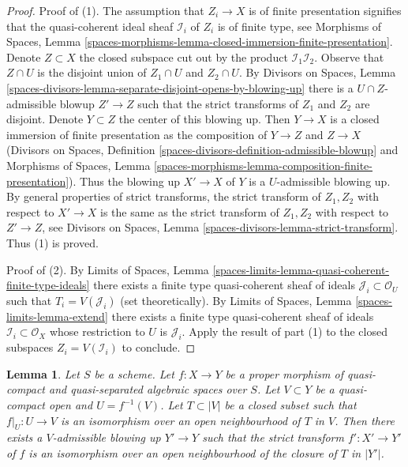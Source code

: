 \documentclass{stacks-project}
\theoremstyle{plain}
\newtheorem{lemma}[subsection]{Lemma}
\theoremstyle{definition}
\theoremstyle{remark}
\numberwithin{equation}{subsection}
\begin{document}
\begin{proof}
Proof of (1). The assumption that $Z_i \to X$ is of finite presentation
signifies that the quasi-coherent ideal sheaf $\mathcal{I}_i$ of $Z_i$
is of finite type, see 
Morphisms of Spaces, Lemma
\ref{spaces-morphisms-lemma-closed-immersion-finite-presentation}.
Denote $Z \subset X$ the closed subspace
cut out by the product $\mathcal{I}_1 \mathcal{I}_2$.
Observe that $Z \cap U$ is the disjoint union
of $Z_1 \cap U$ and $Z_2 \cap U$. By Divisors on Spaces, Lemma
\ref{spaces-divisors-lemma-separate-disjoint-opens-by-blowing-up}
there is a $U \cap Z$-admissible blowup $Z' \to Z$ such that
the strict transforms of $Z_1$ and $Z_2$ are disjoint.
Denote $Y \subset Z$ the center of this blowing up.
Then $Y \to X$ is a closed immersion of finite presentation as the composition
of $Y \to Z$ and $Z \to X$ (Divisors on Spaces, Definition
\ref{spaces-divisors-definition-admissible-blowup} and
Morphisms of Spaces, Lemma
\ref{spaces-morphisms-lemma-composition-finite-presentation}).
Thus the blowing up $X' \to X$ of $Y$ is a $U$-admissible blowing
up. By general properties of strict transforms, the
strict transform of $Z_1, Z_2$ with respect to $X' \to X$
is the same as the strict transform of $Z_1, Z_2$ with respect
to $Z' \to Z$, see
Divisors on Spaces, Lemma \ref{spaces-divisors-lemma-strict-transform}.
Thus (1) is proved.

\medskip\noindent
Proof of (2). By Limits of Spaces, Lemma
\ref{spaces-limits-lemma-quasi-coherent-finite-type-ideals}
there exists a finite type quasi-coherent sheaf of ideals
$\mathcal{J}_i \subset \mathcal{O}_U$ such that
$T_i = V(\mathcal{J}_i)$ (set theoretically).
By Limits of Spaces, Lemma \ref{spaces-limits-lemma-extend}
there exists a finite type quasi-coherent sheaf
of ideals $\mathcal{I}_i \subset \mathcal{O}_X$
whose restriction to $U$ is $\mathcal{J}_i$.
Apply the result of part (1) to the closed
subspaces $Z_i = V(\mathcal{I}_i)$ to conclude.
\end{proof}

\begin{lemma}
\label{lemma-blowup-iso-along}
Let $S$ be a scheme. Let $f : X \to Y$ be a proper morphism of quasi-compact
and quasi-separated algebraic spaces over $S$. Let $V \subset Y$ be a
quasi-compact open and $U = f^{-1}(V)$. Let $T \subset |V|$ be a closed subset
such that $f|_U : U \to V$ is an isomorphism over an open neighbourhood of $T$
in $V$. Then there exists a $V$-admissible blowing up $Y' \to Y$ such that
the strict transform $f' : X' \to Y'$ of $f$ is an isomorphism over an open
neighbourhood of the closure of $T$ in $|Y'|$.
\end{lemma}
\end{document}

